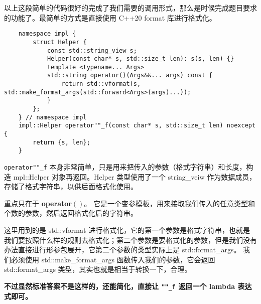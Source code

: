 以上这段简单的代码很好的完成了我们需要的调用形式，那么是时候完成题目要求的功能了。最简单的方式是直接使用 C++20 format 库进行格式化。

\begin{verbatim}
    namespace impl {
        struct Helper {
            const std::string_view s;
            Helper(const char* s, std::size_t len): s(s, len) {}
            template <typename... Args>
            std::string operator()(Args&&... args) const {
                return std::vformat(s, std::make_format_args(std::forward<Args>(args)...));
            }
        };
    } // namespace impl
    impl::Helper operator""_f(const char* s, std::size_t len) noexcept {
        return {s, len};
    }
\end{verbatim}

\texttt{operator""_f} 本身非常简单，只是用来把传入的参数（格式字符串）和长度，构造 mpl::Helper 对象再返回。Helper 类型使用了一个 string\_veiw 作为数据成员，存储了格式字符串，以供后面格式化使用。

重点只在于 \textbf{operator$()$}。 它是一个变参模板，用来接取我们传入的任意类型和个数的参数，然后返回格式化后的字符串。

这里用到的是 std::vformat 进行格式化，它的第一个参数是格式字符串，也就是我们要按照什么样的规则去格式化；第二个参数是要格式化的参数，但是我们没有办法直接进行形参包展开，它第二个参数的类型实际上是 std::format\_args。 我们必须使用 std::make\_format\_args 函数传入我们的参数，它会返回 std::format\_args 类型，其实也就是相当于转换一下，合理。

\textbf{不过显然标准答案不是这样的，还能简化，直接让 \texttt{""_f} 返回一个 lambda 表达式即可。}

\clearpage